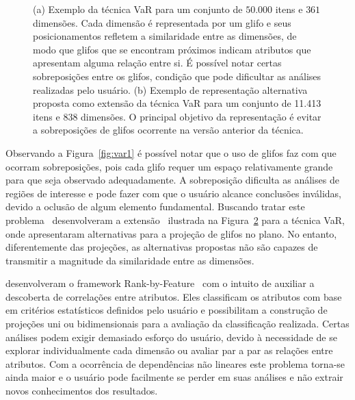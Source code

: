 \begin{figure}[h!]
\begin{subfigure}[b]{0.475\textwidth}
    \caption{}
    \label{fig:var2}
  \end{subfigure}
  \caption[VaR: Value and Relation]{(a) Exemplo da técnica VaR para um conjunto de $50.000$ itens e $361$ dimensões. Cada dimensão é representada por um glifo e seus posicionamentos refletem a similaridade entre as dimensões, de modo que glifos que se encontram próximos indicam atributos que apresentam alguma relação entre si. É possível notar certas sobreposições entre os glifos, condição que pode dificultar as análises realizadas pelo usuário. (b) Exemplo de representação alternativa proposta como extensão da técnica VaR para um conjunto de 11.413 itens e 838 dimensões. O principal objetivo da representação é evitar a sobreposições de glifos ocorrente na versão anterior da técnica.}
\end{figure}

Observando a Figura~\ref{fig:var1} é possível notar que o uso de glifos faz com que ocorram sobreposições, pois cada glifo requer um espaço relativamente grande para que seja observado adequadamente. A sobreposição dificulta as análises de regiões de interesse e pode fazer com que o usuário alcance conclusões inválidas, devido a oclusão de algum elemento fundamental. Buscando tratar este problema~\citeauthor{Yang2007} desenvolveram a extensão~\cite{Yang2007} ilustrada na Figura~\ref{fig:var2} para a técnica VaR, onde apresentaram alternativas para a projeção de glifos no plano. No entanto, diferentemente das projeções, as alternativas propostas não são capazes de transmitir a magnitude da similaridade entre as dimensões.





\citeauthor{Shneiderman2004} desenvolveram o framework Rank-by-Feature~\cite{Shneiderman2004} com o intuito de auxiliar a descoberta de correlações entre atributos. Eles classificam os atributos com base em critérios estatísticos definidos pelo usuário e possibilitam a construção de projeções uni ou bidimensionais para a avaliação da classificação realizada. Certas análises podem exigir demasiado esforço do usuário, devido à necessidade de se explorar individualmente cada dimensão ou avaliar par a par as relações entre atributos. Com a ocorrência de dependências não lineares este problema torna-se ainda maior e o usuário pode facilmente se perder em suas análises e não extrair novos conhecimentos dos resultados.

